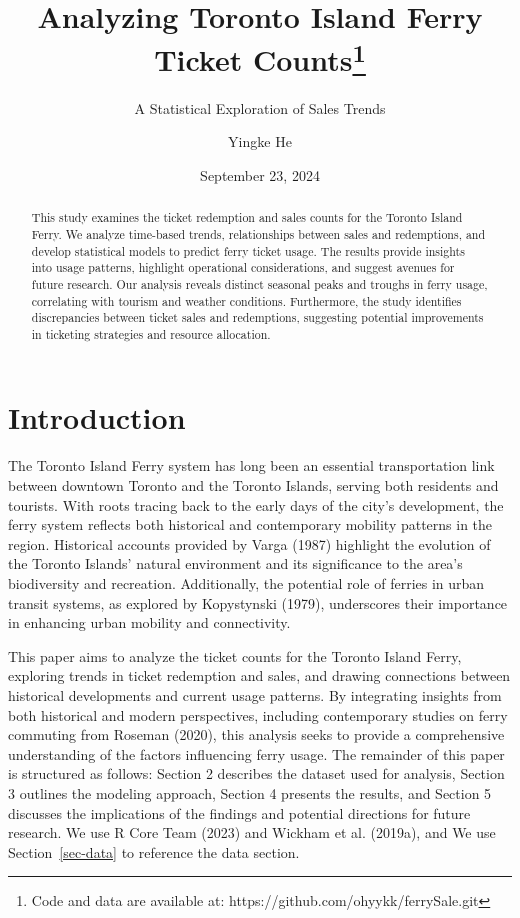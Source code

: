 \documentclass[
  letterpaper,
  DIV=11,
  numbers=noendperiod]{scrartcl}
\title{Analyzing Toronto Island Ferry Ticket Counts\thanks{Code and data
are available at: https://github.com/ohyykk/ferrySale.git}}
\subtitle{A Statistical Exploration of Sales Trends}
\author{Yingke He}
\date{September 23, 2024}
\renewcommand*\contentsname{Table of contents}
\newcommand\contentsname{Table of contents}
\begin{document}
\maketitle
\begin{abstract}
This study examines the ticket redemption and sales counts for the
Toronto Island Ferry. We analyze time-based trends, relationships
between sales and redemptions, and develop statistical models to predict
ferry ticket usage. The results provide insights into usage patterns,
highlight operational considerations, and suggest avenues for future
research. Our analysis reveals distinct seasonal peaks and troughs in
ferry usage, correlating with tourism and weather conditions.
Furthermore, the study identifies discrepancies between ticket sales and
redemptions, suggesting potential improvements in ticketing strategies
and resource allocation.
\end{abstract}

\renewcommand*\contentsname{Table of contents}
{
\hypersetup{linkcolor=}
\setcounter{tocdepth}{3}
\tableofcontents
}

\section{Introduction}\label{introduction}

The Toronto Island Ferry system has long been an essential
transportation link between downtown Toronto and the Toronto Islands,
serving both residents and tourists. With roots tracing back to the
early days of the city's development, the ferry system reflects both
historical and contemporary mobility patterns in the region. Historical
accounts provided by Varga (1987) highlight the evolution of the Toronto
Islands' natural environment and its significance to the area's
biodiversity and recreation. Additionally, the potential role of ferries
in urban transit systems, as explored by Kopystynski (1979), underscores
their importance in enhancing urban mobility and connectivity.

This paper aims to analyze the ticket counts for the Toronto Island
Ferry, exploring trends in ticket redemption and sales, and drawing
connections between historical developments and current usage patterns.
By integrating insights from both historical and modern perspectives,
including contemporary studies on ferry commuting from Roseman (2020),
this analysis seeks to provide a comprehensive understanding of the
factors influencing ferry usage. The remainder of this paper is
structured as follows: Section 2 describes the dataset used for
analysis, Section 3 outlines the modeling approach, Section 4 presents
the results, and Section 5 discusses the implications of the findings
and potential directions for future research. We use R Core Team (2023)
and Wickham et al. (2019a), and We use Section~\ref{sec-data} to
reference the data section.
\end{document}

